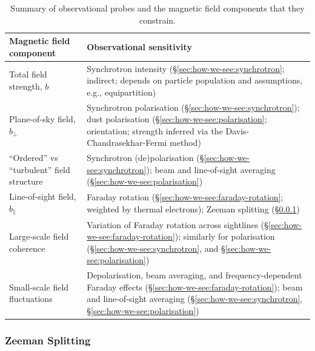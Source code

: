 \documentclass[12pt,twoside]{extreport}
\newcommand{\eg}{e.g.,\xspace} %
\providecommand{\DIFdelbegin}{} %
\providecommand{\DIFdelend}{} %
\providecommand{\DIFaddbeginFL}{} %
\providecommand{\DIFaddendFL}{} %
\providecommand{\DIFdelbeginFL}{} %
\providecommand{\DIFdelendFL}{} %
\providecommand{\DIFscaledelfig}{0.5}
\newlength{\DIFdelgraphicswidth} %
\newlength{\DIFdelgraphicsheight} %
\providecommand{\DIFaddincludegraphics}[2][]{{\color{DIFgreen}\fbox{\DIFOincludegraphics[#1]{#2}}}} %
\providecommand{\DIFdelincludegraphics}[2][]{%
\sbox{\DIFdelgraphicsbox}{\DIFOincludegraphics[#1]{#2}}%
\settoboxwidth{\DIFdelgraphicswidth}{\DIFdelgraphicsbox} %
\settoboxtotalheight{\DIFdelgraphicsheight}{\DIFdelgraphicsbox} %
\scalebox{\DIFscaledelfig}{%
\parbox[b]{\DIFdelgraphicswidth}{\usebox{\DIFdelgraphicsbox}\\[-\baselineskip] \rule{\DIFdelgraphicswidth}{0em}}\llap{\resizebox{\DIFdelgraphicswidth}{\DIFdelgraphicsheight}{%
\setlength{\unitlength}{\DIFdelgraphicswidth}%
\begin{picture}(1,1)%
\thicklines\linethickness{2pt} %
{\color{DIFpurple}\put(0,0){\framebox(1,1){}}}%
{\color{DIFpurple}\put(0,0){\line( 1,1){1}}}%
{\color{DIFpurple}\put(0,1){\line(1,-1){1}}}%
\end{picture}%
}\hspace*{3pt}}} %
} %
\DeclareRobustCommand{\DIFdelbegin}{\DIFOdelbegin \let\includegraphics\DIFdelincludegraphics} %
\DeclareRobustCommand{\DIFdelend}{\DIFOaddend \let\includegraphics\DIFOincludegraphics} %
\DeclareRobustCommand{\DIFaddbeginFL}{\DIFOaddbeginFL \let\includegraphics\DIFaddincludegraphics} %
\DeclareRobustCommand{\DIFaddendFL}{\DIFOaddendFL \let\includegraphics\DIFOincludegraphics} %
\DeclareRobustCommand{\DIFdelbeginFL}{\DIFOdelbeginFL \let\includegraphics\DIFdelincludegraphics} %
\DeclareRobustCommand{\DIFdelendFL}{\DIFOaddendFL \let\includegraphics\DIFOincludegraphics} %
\begin{document}
\begin{table}
\centering
\caption{Summary of observational probes and the magnetic field components that they constrain.}
\label{table:seeing:b-parts}
\DIFdelbeginFL %
\DIFdelendFL \DIFaddbeginFL \renewcommand{\arraystretch}{1.65}
\DIFaddendFL \begin{tabular}{>{\raggedright\arraybackslash}p{} p{}}
    \hline
    Magnetic field component & Observational sensitivity \\
    \hline
    Total field strength, $b$
    & Synchrotron intensity (\S\ref{sec:how-we-see:synchrotron}; indirect; depends on particle population and assumptions, \eg equipartition) \\

    Plane-of-sky field, $b_\perp$
    & Synchrotron polarisation (\S\ref{sec:how-we-see:synchrotron}); dust polarisation (\S\ref{sec:how-we-see:polarisation}; orientation; strength inferred via the Davis-Chandrasekhar-Fermi method) \\

    ``Ordered'' vs ``turbulent'' field structure
    & Synchrotron (de)polarisation (\S\ref{sec:how-we-see:synchrotron}); beam and line-of-sight averaging (\S\ref{sec:how-we-see:polarisation}) \\

    Line-of-sight field, $b_\parallel$
    & Faraday rotation (\S\ref{sec:how-we-see:faraday-rotation}; weighted by thermal electrons); Zeeman splitting (\S\ref{sec:how-we-see:zeeman}) \\

    Large-scale field  coherence
    & Variation of Faraday rotation across sightlines (\S\ref{sec:how-we-see:faraday-rotation}); similarly for polarisation (\S\ref{sec:how-we-see:synchrotron}, and \S\ref{sec:how-we-see:polarisation}) \\

    Small-scale field fluctuations
    & Depolarisation, beam averaging, and frequency-dependent Faraday effects (\S\ref{sec:how-we-see:faraday-rotation}); beam and line-of-sight averaging (\S\ref{sec:how-we-see:synchrotron}, \S\ref{sec:how-we-see:polarisation}) \\
    \hline
\end{tabular}
\end{table}


\DIFdelbegin %

\DIFdelend \subsubsection{Zeeman Splitting}
\label{sec:how-we-see:zeeman}
\end{document}
